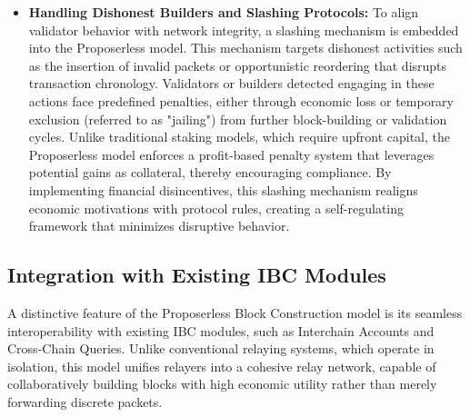 \documentclass{article}
\begin{document}
\begin{itemize}
    \item \textbf{Handling Dishonest Builders and Slashing Protocols:} To align validator behavior with network integrity, a slashing mechanism is embedded into the Proposerless model. This mechanism targets dishonest activities such as the insertion of invalid packets or opportunistic reordering that disrupts transaction chronology. Validators or builders detected engaging in these actions face predefined penalties, either through economic loss or temporary exclusion (referred to as "jailing") from further block-building or validation cycles. Unlike traditional staking models, which require upfront capital, the Proposerless model enforces a profit-based penalty system that leverages potential gains as collateral, thereby encouraging compliance. By implementing financial disincentives, this slashing mechanism realigns economic motivations with protocol rules, creating a self-regulating framework that minimizes disruptive behavior.
\end{itemize}

\subsection{Integration with Existing IBC Modules}

A distinctive feature of the Proposerless Block Construction model is its seamless interoperability with existing IBC modules, such as Interchain Accounts and Cross-Chain Queries. Unlike conventional relaying systems, which operate in isolation, this model unifies relayers into a cohesive relay network, capable of collaboratively building blocks with high economic utility rather than merely forwarding discrete packets.
\end{document}
